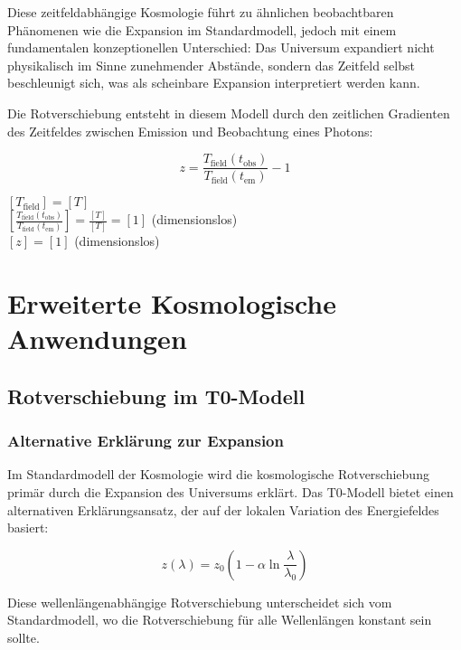 \documentclass[12pt,a4paper]{article}
\theoremstyle{definition}
\begin{document}
Diese zeitfeldabhängige Kosmologie führt zu ähnlichen beobachtbaren Phänomenen wie die Expansion im Standardmodell, jedoch mit einem fundamentalen konzeptionellen Unterschied: Das Universum expandiert nicht physikalisch im Sinne zunehmender Abstände, sondern das Zeitfeld selbst beschleunigt sich, was als scheinbare Expansion interpretiert werden kann.

Die Rotverschiebung entsteht in diesem Modell durch den zeitlichen Gradienten des Zeitfeldes zwischen Emission und Beobachtung eines Photons:

\begin{equation}
	z = \frac{T_{\text{field}}(t_{\text{obs}})}{T_{\text{field}}(t_{\text{em}})} - 1
\end{equation}

\begin{einheitencheck}
	$[T_{\text{field}}] = [T]$ \checkmark\\
	$[\frac{T_{\text{field}}(t_{\text{obs}})}{T_{\text{field}}(t_{\text{em}})}] = \frac{[T]}{[T]} = [1]$ (dimensionslos) \checkmark\\
	$[z] = [1]$ (dimensionslos) \checkmark
\end{einheitencheck}\section{Erweiterte Kosmologische Anwendungen}

\subsection{Rotverschiebung im T0-Modell}

\subsubsection{Alternative Erklärung zur Expansion}

Im Standardmodell der Kosmologie wird die kosmologische Rotverschiebung primär durch die Expansion des Universums erklärt. Das T0-Modell bietet einen alternativen Erklärungsansatz, der auf der lokalen Variation des Energiefeldes basiert:

\begin{equation}
	\boxed{z(\lambda) = z_0\left(1 - \alpha \ln\frac{\lambda}{\lambda_0}\right)}
\end{equation}

Diese wellenlängenabhängige Rotverschiebung unterscheidet sich vom Standardmodell, wo die Rotverschiebung für alle Wellenlängen konstant sein sollte.
\end{document}
